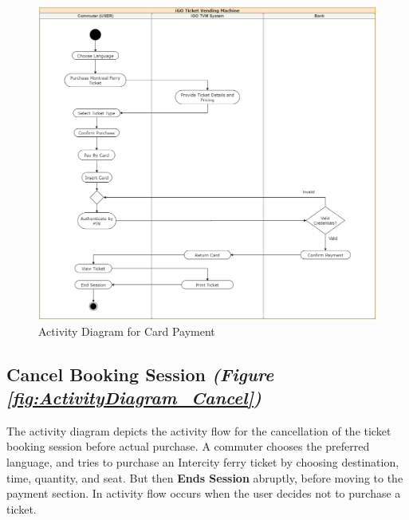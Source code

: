 \documentclass[letterpaper]{report}
\begin{document}
\begin{figure}[ht]
    \centering
    \includegraphics[width=\textwidth, height=0.7\textheight, keepaspectratio]{ActivityDiagrams/AD - 4.png}
    \caption{Activity Diagram for Card Payment}
    \label{fig:ActivityDiagram_Card}
\end{figure}
\clearpage

 \subsection{Cancel Booking Session \emph{(Figure \ref{fig:ActivityDiagram_Cancel})}}
The activity diagram depicts the activity flow for the cancellation of the ticket booking session before actual purchase. A commuter chooses the preferred language, and tries to purchase an Intercity ferry ticket by choosing destination, time, quantity, and seat. But then {\bf Ends Session} abruptly, before moving to the payment section. In activity flow occurs when the user decides not to purchase a ticket.
\vspace{\baselineskip}
\end{document}

